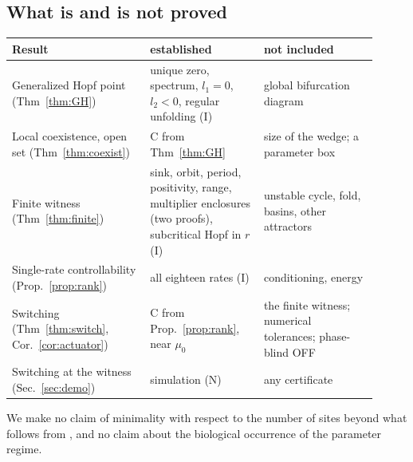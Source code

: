 \documentclass[11pt,a4paper]{article}
\theoremstyle{plain}
\theoremstyle{definition}
\theoremstyle{remark}
\newcommand{\evC}{\textsf{C}}
\newcommand{\evI}{\textsf{I}}
\newcommand{\evN}{\textsf{N}}
\begin{document}
\subsection{What is and is not proved}
\begin{center}\small
\begin{tabular}{>{\raggedright\arraybackslash}p{0.34\linewidth}>{\raggedright\arraybackslash}p{0.28\linewidth}>{\raggedright\arraybackslash}p{0.29\linewidth}}
\toprule
Result & established & not included\\
\midrule
Generalized Hopf point (Thm~\ref{thm:GH}) & unique zero, spectrum, $l_1=0$, $l_2<0$, regular unfolding (\evI) & global bifurcation diagram\\
Local coexistence, open set (Thm~\ref{thm:coexist}) & \evC{} from Thm~\ref{thm:GH} & size of the wedge; a parameter box\\
Finite witness (Thm~\ref{thm:finite}) & sink, orbit, period, positivity, range, multiplier enclosures (two proofs), subcritical Hopf in $r$ (\evI) & unstable cycle, fold, basins, other attractors\\
Single-rate controllability (Prop.~\ref{prop:rank}) & all eighteen rates (\evI) & conditioning, energy\\
Switching (Thm~\ref{thm:switch}, Cor.~\ref{cor:actuator}) & \evC{} from Prop.~\ref{prop:rank}, near $\mu_0$ & the finite witness; numerical tolerances; phase-blind OFF\\
Switching at the witness (Sec.~\ref{sec:demo}) & simulation (\evN) & any certificate\\
\bottomrule
\end{tabular}
\end{center}
We make no claim of minimality with respect to the number of sites beyond what follows from \cite{Vassena26,CompanionOscillations}, and no claim about the biological occurrence of the parameter regime.
\end{document}
